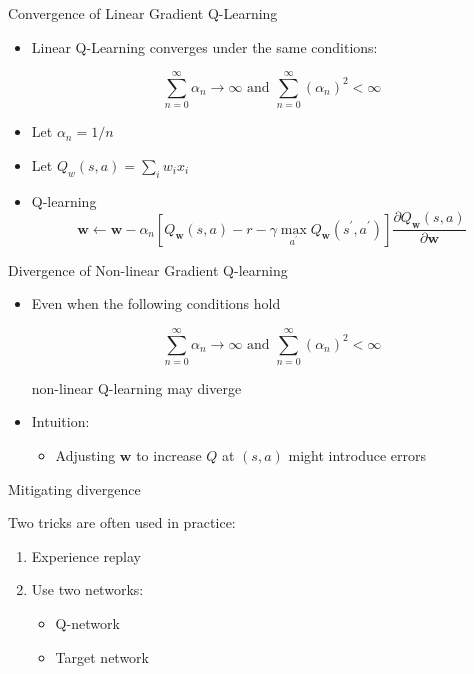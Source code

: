 \documentclass[11pt,table]{beamer}
\begin{document}
\begin{frame}{Convergence of  Linear Gradient Q-Learning}


\begin{itemize}
    \item  Linear Q-Learning converges under the same conditions:

$$
\sum_{n=0}^{\infty} \alpha_{n}\rightarrow\infty \text { and } \sum_{n=0}^{\infty}\left(\alpha_{n}\right)^{2}<\infty
$$

\item Let $\alpha_{n}=1 / n$

\item  Let $Q_{w}(s, a)=\sum_{i} w_{i} x_{i}$

\item  Q-learning
$$
\boldsymbol{w} \leftarrow \boldsymbol{w}-\alpha_{n}\left[Q_{\boldsymbol{w}}(s, a)-r-\gamma \max _{a^{\prime}} Q_{\boldsymbol{w}}\left(s^{\prime}, a^{\prime}\right)\right] \frac{\partial Q_{\boldsymbol{w}}(s, a)}{\partial \boldsymbol{w}}
$$ 
\end{itemize}
    
\end{frame}



\begin{frame}{Divergence of Non-linear Gradient Q-learning}


    \begin{itemize}
        \item Even when the following conditions hold

$$
\sum_{n=0}^{\infty} \alpha_{n}\rightarrow\infty \text { and } \sum_{n=0}^{\infty}\left(\alpha_{n}\right)^{2}<\infty
$$

 non-linear Q-learning may diverge

\item Intuition:

 \begin{itemize}
     \item Adjusting $\boldsymbol{w}$ to increase $Q$ at $(s, a)$ might introduce errors 
 \end{itemize}
    \end{itemize}
\end{frame}

\begin{frame}{Mitigating divergence}

Two tricks are often used in practice:\\[2ex]
 \begin{enumerate}
\item Experience replay\\[2ex]
\item Use two networks:
 \begin{itemize}
\item Q-network
\item Target network
 
 \end{itemize}
 
 \end{enumerate}
\end{frame}
\end{document}
